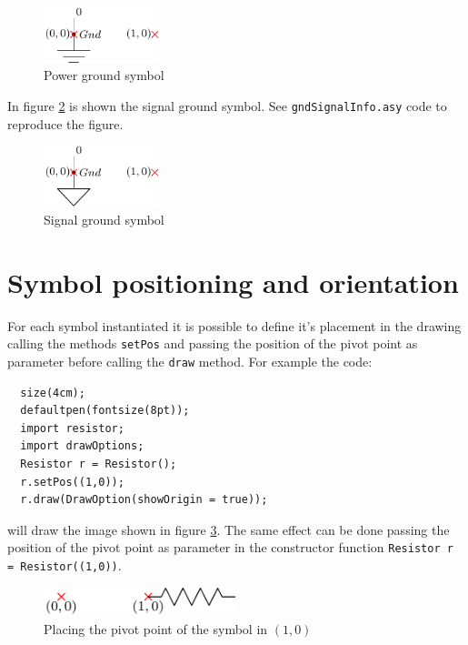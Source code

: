 \documentclass[a4paper,12pt]{report}
\begin{document}
\begin{figure}[ht]
\centering
\includegraphics[width=0.3\textwidth]{gndPowerInfo}
\caption{Power ground symbol}
\label{fig:gndPowerInfo}
\end{figure}

In figure \ref{fig:gndSignalInfo} is shown the signal ground symbol. See \texttt{gndSignalInfo.asy} code to reproduce the figure.

\begin{figure}[ht]
\centering
\includegraphics[width=0.3\textwidth]{gndSignalInfo}
\caption{Signal ground symbol}
\label{fig:gndSignalInfo}
\end{figure}

\clearpage
\section*{Symbol positioning and orientation}
For each symbol instantiated it is possible to define it's placement in the drawing calling the methods \texttt{setPos} and passing the position of the pivot point as parameter before calling the \texttt{draw} method. For example the code:
\begin{lstlisting}
  size(4cm);
  defaultpen(fontsize(8pt));
  import resistor;
  import drawOptions;
  Resistor r = Resistor();
  r.setPos((1,0));
  r.draw(DrawOption(showOrigin = true));
\end{lstlisting}
will draw the image shown in figure \ref{fig:placingExample1}. The same effect can be done passing the position of the pivot point as parameter in the constructor function \texttt{Resistor r = Resistor((1,0))}.
\begin{figure}[ht]
  \centering
  \includegraphics[width=0.5\textwidth]{placingExample1.pdf}
  \caption{Placing the pivot point of the symbol in $(1,0)$}
  \label{fig:placingExample1}
\end{figure}
\end{document}
